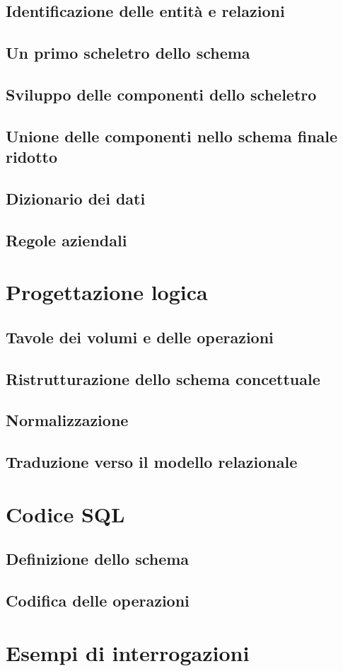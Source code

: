 \documentclass[a4paper,11pt]{article}
\begin{document}
\subsection{Identificazione delle entità e relazioni}

\subsection{Un primo scheletro dello schema}

\subsection{Sviluppo delle componenti dello scheletro}

\subsection{Unione delle componenti nello schema finale ridotto}

\subsection{Dizionario dei dati}

\subsection{Regole aziendali}

\section{Progettazione logica}

\subsection{Tavole dei volumi e delle operazioni}

\subsection{Ristrutturazione dello schema concettuale}

\subsection{Normalizzazione}

\subsection{Traduzione verso il modello relazionale}

\section{Codice SQL}

\subsection{Definizione dello schema}

\subsection{Codifica delle operazioni}

\section{Esempi di interrogazioni}
\end{document}
